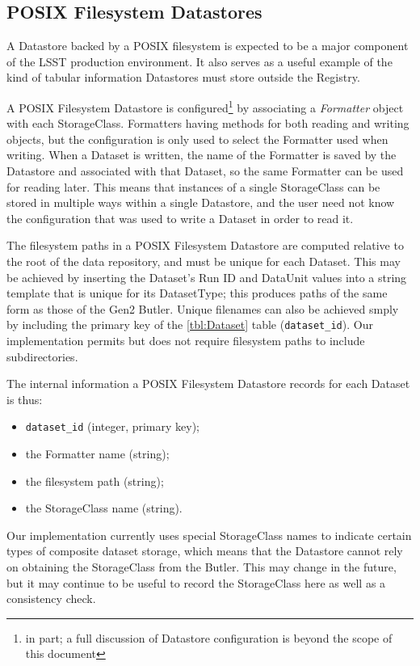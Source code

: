 \documentclass[DM,toc]{lsstdoc}
\begin{document}
\subsection{POSIX Filesystem Datastores}

A Datastore backed by a POSIX filesystem is expected to be a major component of the LSST production environment.
It also serves as a useful example of the kind of tabular information Datastores must store outside the Registry.

A POSIX Filesystem Datastore is configured\footnote{in part; a full discussion of Datastore configuration is beyond the scope of this document} by associating a \emph{Formatter} object with each StorageClass.
Formatters having methods for both reading and writing objects, but the configuration is only used to select the Formatter used when writing.
When a Dataset is written, the name of the Formatter is saved by the Datastore and associated with that Dataset, so the same Formatter can be used for reading later.
This means that instances of a single StorageClass can be stored in multiple ways within a single Datastore, and the user need not know the configuration that was used to write a Dataset in order to read it.

The filesystem paths in a POSIX Filesystem Datastore are computed relative to the root of the data repository, and must be unique for each Dataset.
This may be achieved by inserting the Dataset's Run ID and DataUnit values into a string template that is unique for its DatasetType; this produces paths of the same form as those of the Gen2 Butler.
Unique filenames can also be achieved smply by including the primary key of the \ref{tbl:Dataset} table (\texttt{dataset\_id}).
Our implementation permits but does not require filesystem paths to include subdirectories.

The internal information a POSIX Filesystem Datastore records for each Dataset is thus:
\begin{itemize}
\item \texttt{dataset\_id} (integer, primary key);
\item the Formatter name (string);
\item the filesystem path (string);
\item the StorageClass name (string).
\end{itemize}
Our implementation currently uses special StorageClass names to indicate certain types of composite dataset storage, which means that the Datastore cannot rely on obtaining the StorageClass from the Butler.
This may change in the future, but it may continue to be useful to record the StorageClass here as well as a consistency check.
\end{document}
